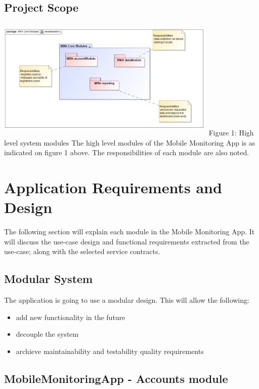 \documentclass[hidelinks, 12pt, oneside]{article}
\begin{document}
	\subsection{Project Scope}
		{\centering
		
		\includegraphics[width=400px,height=220px]{img/highLevelSystem.jpg}
		\newline
		Figure 1: High level system modules
		\newline\newline
		The high level modules of the Mobile Monitoring App is as indicated on figure 1 above. The responsibilities of each module are also noted.
		}
	
	\section{Application Requirements and Design}
	The following section will explain each module in the Mobile Monitoring App. It will discuss the use-case design and  functional requirements extracted from the use-case; along with the selected service contracts.\newline
	
	\subsection{Modular System}
	 The application is going to use a modular design. This will allow the following:
	 \begin{itemize}
	\item add new functionality in the future
 	\item decouple the system
 	\item archieve maintainability and testability quality requirements
	\end{itemize}


	
	\subsection{MobileMonitoringApp - Accounts module}
\end{document}
